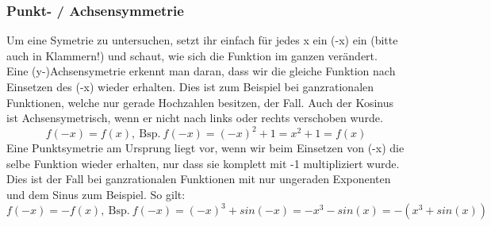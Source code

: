 \subsubsection{Punkt- / Achsensymmetrie}
Um eine Symetrie zu untersuchen, setzt ihr einfach für jedes x ein (-x) ein (bitte auch in Klammern!) und schaut, wie sich die Funktion im ganzen verändert.\\
Eine (y-)Achsensymetrie erkennt man daran, dass wir die gleiche Funktion nach Einsetzen des (-x) wieder erhalten. Dies ist zum Beispiel bei ganzrationalen Funktionen, welche nur gerade Hochzahlen besitzen, der Fall. Auch der Kosinus ist Achsensymetrisch, wenn er nicht nach links oder rechts verschoben wurde.
\[f(-x)=f(x),\mathrm{\ Bsp.\ } f(-x)=(-x)^2+1=x^2+1=f(x)\]
Eine Punktsymetrie am Ursprung liegt vor, wenn wir beim Einsetzen von (-x) die selbe Funktion wieder erhalten, nur dass sie komplett mit -1 multipliziert wurde. Dies ist der Fall bei ganzrationalen Funktionen mit nur ungeraden Exponenten und dem Sinus zum Beispiel. So gilt:
\[f(-x)=-f(x),\mathrm{\ Bsp.\ } f(-x)=(-x)^3+sin(-x)=-x^3-sin(x)=-(x^3+sin(x))\]
